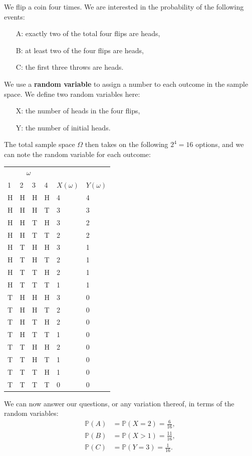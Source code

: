 \documentclass{article}
\begin{document}
\begin{testexample}
    We flip a coin four times. We are interested in the probability of the following events:
    \begin{enumerate}
        \item[A:]  exactly two of the total four flips are heads,
        \item[B:] at least two of the four flips are heads,
        \item[C:] the first three throws are heads.
    \end{enumerate}
    We use a \textbf{random variable} to assign a number to each outcome in the sample space. We define two random variables here:
    \begin{enumerate}
        \item[X:] the number of heads in the four flips,
        \item[Y:] the number of initial heads.
    \end{enumerate}
    The total sample space $\Omega$ then takes on the following $2^4=16$ options, and we can note the random variable for each outcome:
\begin{center}
    \begin{tabular}{@{}llll|ll}
\toprule
\multicolumn{4}{c|}{$\omega$}\\
1&2&3&4 & $X(\omega)$ & $Y(\omega)$ \\ \hline
H&H&H&H&4&4\\
H&H&H&T&3&3\\
H&H&T&H&3&2\\
H&H&T&T&2&2\\
H&T&H&H&3&1\\
H&T&H&T&2&1\\
H&T&T&H&2&1\\
H&T&T&T&1&1\\
T&H&H&H&3&0\\
T&H&H&T&2&0\\
T&H&T&H&2&0\\
T&H&T&T&1&0\\
T&T&H&H&2&0\\
T&T&H&T&1&0\\
T&T&T&H&1&0\\
T&T&T&T&0&0\\ \bottomrule
\end{tabular}
\end{center}
We can now answer our questions, or any variation thereof, in terms of the random variables:
\begin{align}
    \mathbb{P}(A)&=\mathbb{P}(X=2)=\frac{6}{16},\\
    \mathbb{P}(B)&=\mathbb{P}(X>1)=\frac{11}{16},\\
    \mathbb{P}(C)&=\mathbb{P}(Y=3)=\frac{1}{16}.
\end{align}
\end{testexample}
\end{document}
